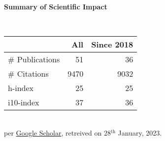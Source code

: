\headedsection %
{\bf Summary of Scientific Impact}{}{}
{
    \qquad~~~~
    \begin{minipage}[t]{0.6\textwidth}
        \begin{tabular}{lrr}
        \hline
         & All & Since 2018\\
        \hline
        \# Publications & 51    & 36    \\
        \# Citations    & 9470  & 9032  \\
        h-index         & 25    & 25    \\
        i10-index       & 37    & 36    \\
        \hline
    \end{tabular}
    \\
    {\footnotesize{
        per \href{https://scholar.google.com/citations?user=wpLQuroAAAAJ}{Google Scholar},
        retreived on 28$^\text{th}$ January, 2023.
        }
    }
    \end{minipage}
     
}